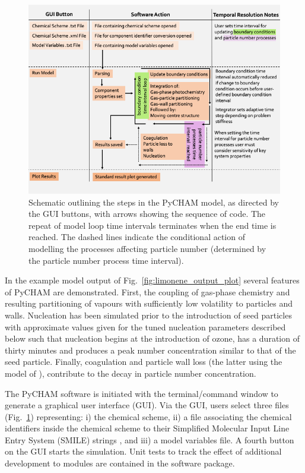 \documentclass[gmd, manuscript]{copernicus}
\begin{document}
\begin{figure}[t]
\includegraphics[width=12.0cm]{Results/model_flow_diagram.png}
\caption{Schematic outlining the steps in the PyCHAM model, as directed by the GUI buttons, with arrows showing the sequence of code.  The repeat of model loop time intervals terminates when the end time is reached.  The dashed lines indicate the conditional action of modelling the processes affecting particle number (determined by the particle number process time interval).}
\label{fig:schematic}
\end{figure}

In the example model output of Fig.~\ref{fig:limonene_output_plot} several features of PyCHAM are demonstrated.  First, the coupling of gas-phase chemistry and resulting partitioning of vapours with sufficiently low volatility to particles and walls.  Nucleation has been simulated prior to the introduction of seed particles with approximate values given for the tuned nucleation parameters described below such that nucleation begins at the introduction of ozone, has a duration of thirty minutes and produces a peak number concentration similar to that of the seed particle.  Finally, coagulation and particle wall loss (the latter using the model of \citet{McMurry1985}), contribute to the decay in particle number concentration.

The PyCHAM software is initiated with the terminal/command window to generate a graphical user interface (GUI).  Via the GUI, users select three files (Fig.~\ref{fig:schematic}) representing: i) the chemical scheme, ii) a file associating the chemical identifiers inside the chemical scheme to their Simplified Molecular Input Line Entry System (SMILE) strings \citep{Weininger1988}, and iii) a model variables file.  A fourth button on the GUI starts the simulation.  Unit tests to track the effect of additional development to modules are contained in the software package.
\end{document}
